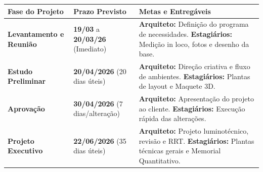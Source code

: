 \documentclass[11pt,a4paper]{article}
\begin{document}
\vspace{0.3cm}

\begin{tcolorbox}[boxmodern, title=$3.$ Cronograma e Atribuição de Metas]
\renewcommand{\arraystretch}{1.4}
\begin{tabularx}{\textwidth}{@{}p{3.2cm}p{2.5cm}X@{}}
\toprule
\textbf{Fase do Projeto} & \textbf{Prazo \newline Previsto} & \textbf{Metas e Entregáveis} \\
\midrule
\textbf{Levantamento e Reunião} & \textbf{19/03} a \textbf{20/03/26} \newline (Imediato) & 
\textbf{Arquiteto:} Definição do programa de necessidades. \newline 
\textbf{Estagiários:} Medição in loco, fotos e desenho da base. \\

\textbf{Estudo \newline Preliminar} & \textbf{20/04/2026} \newline (20 dias úteis) & 
\textbf{Arquiteto:} Direção criativa e fluxo de ambientes. \newline 
\textbf{Estagiários:} Plantas de layout e Maquete 3D. \\

\textbf{Aprovação} & \textbf{30/04/2026} \newline (7 dias/alteração) & 
\textbf{Arquiteto:} Apresentação do projeto ao cliente. \newline 
\textbf{Estagiários:} Execução rápida das alterações. \\

\textbf{Projeto \newline Executivo} & \textbf{22/06/2026} \newline (35 dias úteis) & 
\textbf{Arquiteto:} Projeto luminotécnico, revisão e RRT. \newline 
\textbf{Estagiários:} Plantas técnicas gerais e Memorial Quantitativo. \\
\bottomrule
\end{tabularx}
\end{tcolorbox}

\vspace{0.3cm}
\end{document}
